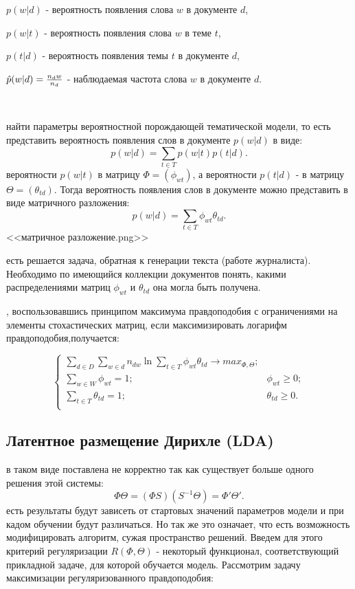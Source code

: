  $p(w|d)$ - вероятность появления слова $w$ в документе $d$,

 $p(w|t)$ - вероятность появления слова $w$ в теме $t$,

 $p(t|d)$ - вероятность появления темы $t$ в документе $d$,

 $\hat{p}(w|d) = {{n_dw}\over{n_d}}$ - наблюдаемая частота слова $w$ в документе $d$.


~\

 найти параметры вероятностной порождающей тематической модели, то есть представить вероятность появления слов в документе $p(w|d)$ в виде:
$$
p(w|d) = \sum_{t \in T}{ p(w|t) p(t|d) }.
$$
 вероятности $p(w|t)$ в матрицу $\Phi=(\phi_{wt})$, а вероятности $p(t|d)$ - в матрицу $\Theta=(\theta_{td})$. Тогда вероятность появления слов в документе можно представить в виде матричного разложения:
$$
p(w|d) = \sum_{t \in T}{ \phi_{wt} \theta_{td} }.
$$
<<матричное разложение.png>>

 есть решается задача, обратная к генерации текста (работе журналиста). Необходимо по имеющийся коллекции документов понять, какими распределениями матриц $\phi_{wt}$ и $\theta_{td}$ она могла быть получена.


, воспользовавшись принципом максимума правдоподобия с ограничениями на элементы стохастических матриц, если максимизировать  логарифм правдоподобия,получается:

$$ 
\begin{cases}
    \sum_{d \in D} \sum_{w \in d} n_{dw} \ln{\sum_{t \in T} \phi_{wt} \theta_{td} } \rightarrow max_{\Phi,\Theta};\\
    \sum_{w \in W}\phi_{wt} = 1; &\phi_{wt} \ge 0;\\
    \sum_{t \in T}\theta_{td} = 1; &\theta_{td} \ge 0.\\
\end{cases}
$$

\subsection{Латентное размещение Дирихле (LDA)}

 в таком виде поставлена не корректно так как существует больше одного решения этой системы:
$$
\Phi\Theta = (\Phi S)(S^{-1}\Theta)=\Phi'\Theta'.
$$
 есть результаты будут зависеть от стартовых значений параметров модели и при кадом обучении будут различаться. Но так же это означает, что есть возможность модифицировать алгоритм, сужая пространство решений. Введем для этого критерий регуляризации $R(\Phi,\Theta)$ - некоторый функционал, соответствующий прикладной задаче, для которой обучается модель. Рассмотрим задачу максимизации регуляризованного правдоподобия:

